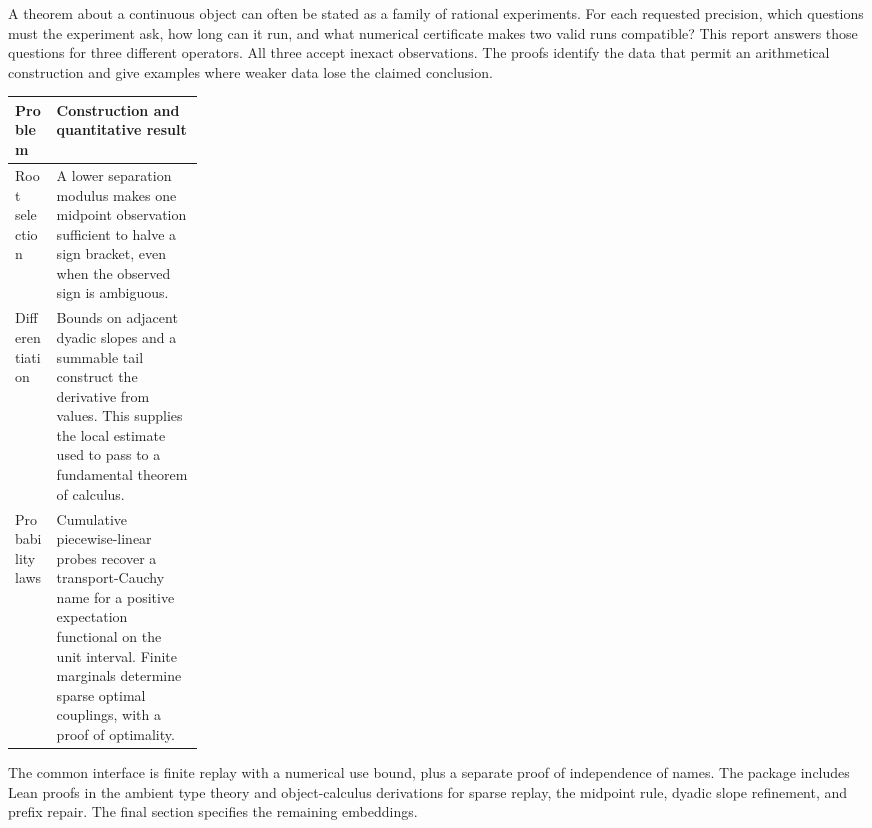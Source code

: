 \documentclass[11pt,letterpaper]{article}
\theoremstyle{definition}
\begin{document}
\thispagestyle{empty}
\par
\vspace{1.1em}
\par
\vspace{0.7em}
\par
\vspace{1em}
\noindent A theorem about a continuous object can often be stated as a family of rational
experiments. For each requested precision, which questions must the experiment
ask, how long can it run, and what numerical certificate makes two valid runs
compatible? This report answers those questions for three different operators.
All three accept inexact observations. The proofs identify the data that permit
an arithmetical construction and give examples where weaker data lose the
claimed conclusion.
\medskip

\noindent\begin{tabularx}{\linewidth}{@{}p{0.22\linewidth}Y@{}}
\toprule
Problem & Construction and quantitative result\\
\midrule
Root selection & A lower separation modulus makes one midpoint observation sufficient to halve a sign bracket, even when the observed sign is ambiguous.\\[3pt]
Differentiation & Bounds on adjacent dyadic slopes and a summable tail construct the derivative from values. This supplies the local estimate used to pass to a fundamental theorem of calculus.\\[3pt]
Probability laws & Cumulative piecewise-linear probes recover a transport-Cauchy name for a positive expectation functional on the unit interval. Finite marginals determine sparse optimal couplings, with a proof of optimality.\\
\bottomrule
\end{tabularx}

\medskip
The common interface is finite replay with a numerical use bound, plus a
separate proof of independence of names. The package includes Lean proofs in
the ambient type theory and object-calculus derivations for sparse replay, the midpoint rule, dyadic slope refinement,
and prefix repair. The final section specifies the remaining embeddings.
\tableofcontents
\clearpage







\end{document}
